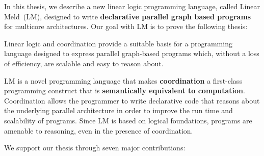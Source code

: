 
In this thesis, we describe a new linear logic programming language, called
Linear Meld~(LM), designed to write \textbf{declarative parallel graph based
programs} for multicore architectures. Our goal with LM is to prove the
following thesis:

\begin{displayquote}
Linear logic and coordination provide a suitable basis for a programming language
designed to express parallel graph-based programs which, without a loss of
efficiency, are scalable and easy to reason about.
\end{displayquote}

LM is a novel programming language that makes \textbf{coordination} a
first-class programming construct that is \textbf{semantically equivalent to
computation}. Coordination allows the programmer to write declarative code that
reasons about the underlying parallel architecture in order to improve the run
time and scalability of programs. Since LM is based on logical foundations,
programs are amenable to reasoning, even in the presence of coordination.

We support our thesis through seven major contributions:

